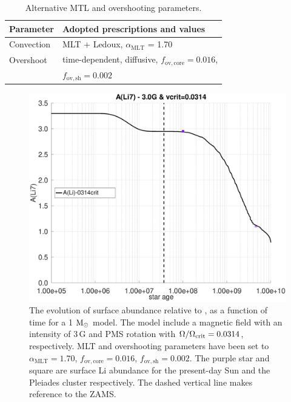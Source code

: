 \documentclass[fleqn,usenatbib]{mnras}
\begin{document}
\begin{table}
	\centering
	\caption{Alternative MTL and overshooting parameters.}
	\label{tab:phy_alt_mesa}
	\begin{tabular}{ll} 
		\hline
		Parameter & Adopted prescriptions and values\\
		\hline
		Convection & MLT + Ledoux, $\alpha_\mathrm{MLT}$ = 1.70\\
		Overshoot & time-dependent, diffusive, $f_\mathrm{ov,core}=0.016$, \\ & $f_\mathrm{ov,sh}=0.002$\\
		\hline
	\end{tabular}
\end{table}


\begin{figure}
	\includegraphics[trim = 25mm 10mm 15mm 10mm, clip,width=\columnwidth]{figures/li_3_0g_0314vc.eps}
    \caption{The evolution of surface  abundance relative to , as a function of time for a 1 $\mathrm{M}_\odot$ model. The model include a magnetic field with an intensity of 3\,G and PMS rotation with $\Omega / \Omega_{\mathrm{crit}}= 0.0314$, respectively. MLT and overshooting parameters have been set to $\alpha_\mathrm{MLT}=1.70$, $f_\mathrm{ov,core}=0.016$, $f_\mathrm{ov,sh}=0.002$. The purple star and square are surface Li abundance for the present-day Sun \citep{Asplund2009} and the Pleiades cluster \citep{Sestito2005} respectively. The dashed vertical line makes reference to the ZAMS.}
    \label{fig:li_3_0g_0314vc}
\end{figure}
\end{document}
